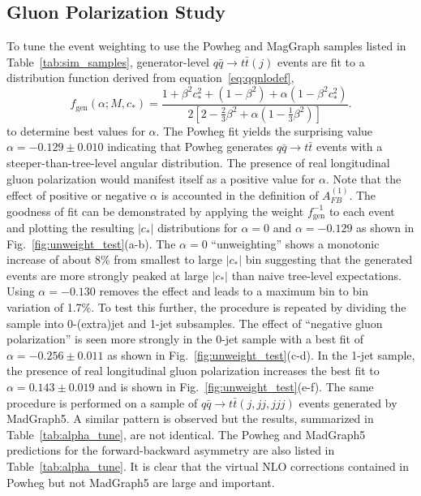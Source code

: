 \documentclass{cmspaperpdf}
\begin{document}
\subsection{Gluon Polarization Study}
To tune the event weighting to use the Powheg and MagGraph samples listed in Table~\ref{tab:sim_samples}, generator-level $q\bar q\to t\bar t(j)$ events are fit to a distribution function derived from equation~\ref{eq:qqnlodef},
\begin{equation}
f_\mathrm{gen}(\alpha;M,c_*) = \frac{1+\beta^2c_*^2+\left(1-\beta^2\right)+\alpha\left(1-\beta^2c_*^2\right)}{2\left[2-\frac{2}{3}\beta^2+\alpha\left(1-\frac{1}{3}\beta^2\right)\right]}. \label{eq:wgt_test}
\end{equation}
to determine best values for $\alpha$.  The Powheg fit yields the surprising value $\alpha = -0.129\pm0.010$ indicating that Powheg generates $q\bar q\to t\bar t$ events with a steeper-than-tree-level angular distribution.  The presence of real longitudinal gluon polarization would manifest itself as a positive value for $\alpha$.  Note that the effect of positive or negative $\alpha$ is accounted in the definition of $A_{FB}^{(1)}$.  The goodness of fit can be demonstrated by applying the weight $f^{-1}_\mathrm{gen}$ to each event and plotting the resulting $|c_*|$ distributions for $\alpha = 0$ and $\alpha = -0.129$ as shown in Fig.~\ref{fig:unweight_test}(a-b).  The $\alpha=0$ ``unweighting'' shows a monotonic increase of about 8\% from smallest to large $|c_*|$ bin suggesting that the generated events are more strongly peaked at large $|c_*|$ than naive tree-level expectations.  Using $\alpha = -0.130$ removes the effect and leads to a maximum bin to bin variation of 1.7\%.  To test this further, the procedure is repeated by dividing the sample into 0-(extra)jet and 1-jet subsamples.  The effect of ``negative gluon polarization'' is seen more strongly in the 0-jet sample with a best fit of $\alpha=-0.256\pm0.011$ as shown in Fig.~\ref{fig:unweight_test}(c-d).  In the 1-jet sample, the presence of real longitudinal gluon polarization increases the best fit to $\alpha=0.143\pm0.019$ and is shown in Fig.~\ref{fig:unweight_test}(e-f).  The same procedure is performed on a sample of $q\bar q \to t\bar t(j,jj,jjj)$ events generated by MadGraph5.  A similar pattern is observed but the results, summarized in Table~\ref{tab:alpha_tune}, are not identical.  The Powheg and MadGraph5 predictions for the forward-backward asymmetry are also listed in Table~\ref{tab:alpha_tune}.  It is clear that the virtual NLO corrections contained in Powheg but not MadGraph5 are large and important.
\end{document}
